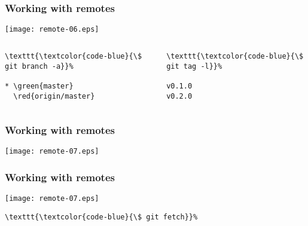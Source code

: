 \documentclass[english]{beamer}
\newcommand{\CMD}[1]{%
\texttt{\textcolor{code-blue}{#1}}%
}
\newcommand{\green}[1]{%
\textcolor{code-green}{#1}%
}
\newcommand{\red}[1]{%
\textcolor{code-red}{#1}%
}
\begin{document}
\begin{frame}[fragile]
\frametitle{Working with remotes}

\texttt{[image: remote-06.eps]}

\begin{columns}[t]
        \begin{column}[T]{.5\textwidth}
{\tiny
\begin{Verbatim}[commandchars=\\\{\}]
\CMD{\$ git branch -a}
* \green{master}
  \red{origin/master}
\end{Verbatim}
}

        \end{column}
        \begin{column}[T]{.5\textwidth}
\pause{}
{\tiny
\begin{Verbatim}[commandchars=\\\{\}]
\CMD{\$ git tag -l}
v0.1.0
v0.2.0
\end{Verbatim}
}
        \end{column}
\end{columns}

\vspace{\textheight}
\end{frame}

\begin{frame}[fragile]
\frametitle{Working with remotes}

\texttt{[image: remote-07.eps]}

\vspace{\textheight}
\end{frame}

\begin{frame}[fragile]
\frametitle{Working with remotes}

\texttt{[image: remote-07.eps]}

\begin{Verbatim}[commandchars=\\\{\}]
\CMD{\$ git fetch}
\end{Verbatim}
\vspace{\textheight}
\end{frame}
\end{document}
